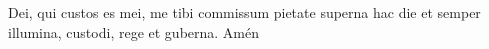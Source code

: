  Dei, qui custos es mei, me tibi commissum pietate superna hac die et semper illumina, custodi, rege et guberna. Amén